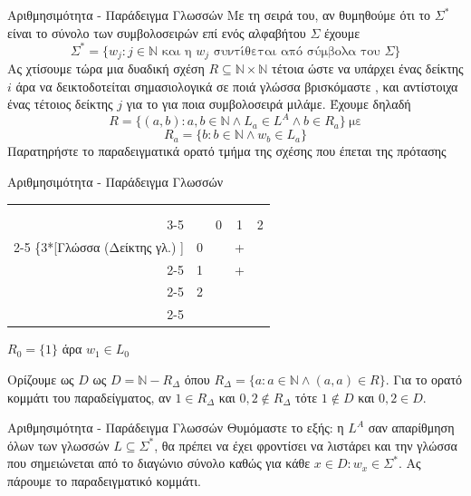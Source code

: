 \documentclass[size=14pt, paper=smartboard, style=fyma, mode=present]{powerdot}
\begin{document}
\begin{slide}[toc=]{Αριθμησιμότητα - Παράδειγμα Γλωσσών}
	{\large Με τη σειρά του, αν θυμηθούμε ότι το $\Sigma^*$ είναι το σύνολο των συμβολοσειρών επί ενός αλφαβήτου $\Sigma$ έχουμε
		\begin{equation*}
			\Sigma^* = \{w_j : j \in \mathbb{N} \text{ και η } w_j \text{ συντίθεται από σύμβολα του } \Sigma\}
	\end{equation*}
	\pause 
	Ας χτίσουμε τώρα μια δυαδική σχέση $R \subseteq \mathbb{N} \times \mathbb{N}$ τέτοια ώστε να υπάρχει ένας δείκτης $i$ άρα να δεικτοδοτείται σημασιολογικά σε ποιά γλώσσα βρισκόμαστε , και αντίστοιχα ένας τέτοιος δείκτης $j$ για το για ποια συμβολοσειρά μιλάμε. \pause Έχουμε δηλαδή
	$$R = \{(a,b) : a,b \in \mathbb{N} \land L_a \in L^A \land b \in R_a\} ~ \text{με} $$
	$$R_a = \{b : b \in \mathbb{N} \land w_b \in L_a\}$$
	\pause Παρατηρήστε το παραδειγματικά ορατό τμήμα της σχέσης που έπεται της πρότασης
}
\end{slide}

\begin{slide}[toc=]{Αριθμησιμότητα - Παράδειγμα Γλωσσών}
{ \Large	\begin{center}
		\begin{tabular}{rl|c|c|c|}
			\multicolumn{2}{c}{} & \multicolumn{3}{c}{\makebox[0pt]{\small Συμβολοσειρά (Δείκτης συμ/σειράς)}} \\[-1ex]
			\multicolumn{2}{c}{} & \multicolumn{3}{c}{\downbracefill} \\
			\cline{3-5}
			& & 0 & 1 & 2 \\ \cline{2-5}
			\ldelim\{{3}{*}[{\small Γλώσσα (Δείκτης γλ.) }] & \multicolumn{1}{|l|}{0} &   & + &   \\ \cline{2-5}
			& \multicolumn{1}{|l|}{1} &   & + &   \\ \cline{2-5}
			& \multicolumn{1}{|l|}{2} &   &   &   \\ \cline{2-5}
		\end{tabular}
		\quad $R_0 = \{1\}$ άρα $w_1 \in L_0$
	\end{center}
	\pause
	Ορίζουμε ως $D$  ως $D = \mathbb{N} - R_\Delta$ όπου $R_\Delta = \{a : a \in \mathbb{N} \land (a,a) \in R\}$. \pause Για το ορατό κομμάτι του παραδείγματος, αν $1 \in R_\Delta$ και $0, 2 \notin R_\Delta$ τότε $1 \notin D$ και $0, 2 \in D$.
}
\end{slide}

\begin{slide}[toc=]{Αριθμησιμότητα - Παράδειγμα Γλωσσών}
	{ \Large Θυμόμαστε το εξής: η $L^A$ σαν απαρίθμηση όλων των γλωσσών $L \subseteq \Sigma^*$, θα πρέπει να έχει φροντίσει να λιστάρει και την γλώσσα που σημειώνεται από το διαγώνιο σύνολο καθώς για κάθε $x \in D : w_x \in \Sigma^*$. Ας πάρουμε το παραδειγματικό κομμάτι.	}
\end{slide}
\end{document}
